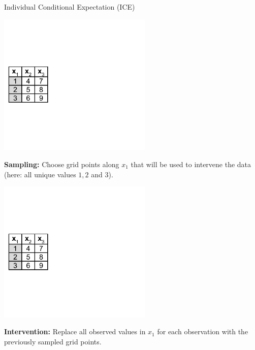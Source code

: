 \documentclass[11pt,compress,t,notes=noshow, xcolor=table]{beamer}
\begin{document}
\begin{vbframe}{Individual Conditional Expectation (ICE)}
\vspace*{-\lineskip}

\includegraphics[page=1, width=0.55\textwidth]{figure_man/ice_pd_plot_demo}

\textbf{Sampling:} Choose grid points along $x_1  $ that will be used to intervene the data (here: all unique values $1, 2$ and $3$).

\framebreak

\includegraphics[page=2, width=0.55\textwidth]{figure_man/ice_pd_plot_demo}

\textbf{Intervention:} Replace all observed values in $x_1$ for each observation with the previously sampled grid points.

\framebreak


\end{vbframe}
\end{document}
